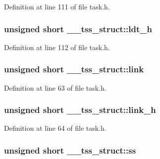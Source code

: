 Definition at line 111 of file task.\+h.

\subsubsection[{\texorpdfstring{ldt\+\_\+h}{ldt_h}}]{\setlength{\rightskip}{0pt plus 5cm}unsigned short \+\_\+\+\_\+tss\+\_\+struct\+::ldt\+\_\+h}\hypertarget{struct____tss__struct_a8b926ac70ecae62767750d002da4112e}{}\label{struct____tss__struct_a8b926ac70ecae62767750d002da4112e}


Definition at line 112 of file task.\+h.

\subsubsection[{\texorpdfstring{link}{link}}]{\setlength{\rightskip}{0pt plus 5cm}unsigned short \+\_\+\+\_\+tss\+\_\+struct\+::link}\hypertarget{struct____tss__struct_ae95a2fc5b42ac4b190cb4c340dfe0ab2}{}\label{struct____tss__struct_ae95a2fc5b42ac4b190cb4c340dfe0ab2}


Definition at line 63 of file task.\+h.

\subsubsection[{\texorpdfstring{link\+\_\+h}{link_h}}]{\setlength{\rightskip}{0pt plus 5cm}unsigned short \+\_\+\+\_\+tss\+\_\+struct\+::link\+\_\+h}\hypertarget{struct____tss__struct_a09d41cf0b65451fe0238b32ae9797bf0}{}\label{struct____tss__struct_a09d41cf0b65451fe0238b32ae9797bf0}


Definition at line 64 of file task.\+h.

\subsubsection[{\texorpdfstring{ss}{ss}}]{\setlength{\rightskip}{0pt plus 5cm}unsigned short \+\_\+\+\_\+tss\+\_\+struct\+::ss}\hypertarget{struct____tss__struct_abc595ca5102923b8b55bb4ce98bbe8db}{}\label{struct____tss__struct_abc595ca5102923b8b55bb4ce98bbe8db}



